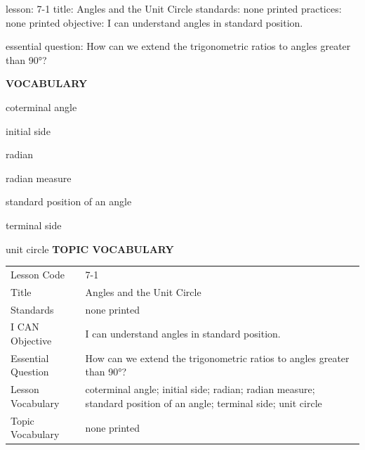 \documentclass{article}
\newenvironment{lesson-meta}{}{}        %
\newcommand{\te}[1]{}                   %
\begin{document}
\begin{lesson-meta}
lesson: 7-1
title: Angles and the Unit Circle
standards: none printed
practices: none printed
objective: I can understand angles in standard position.

essential question: How can we extend the trigonometric ratios to angles greater than 90°?

\textbf{VOCABULARY}
\item coterminal angle
\item initial side
\item radian
\item radian measure
\item standard position of an angle
\item terminal side
\item unit circle
\textbf{TOPIC VOCABULARY}
\te{No separate topic vocabulary list is printed on these lesson pages.}
\begin{tabular}{ll}
Lesson Code & 7-1 \\
Title & Angles and the Unit Circle \\
Standards & none printed \\
I CAN Objective & I can understand angles in standard position. \\
Essential Question & How can we extend the trigonometric ratios to angles greater than 90°? \\
Lesson Vocabulary & coterminal angle; initial side; radian; radian measure; standard position of an angle; terminal side; unit circle \\
Topic Vocabulary & none printed \\
\end{tabular}
\end{lesson-meta}
\end{document}
